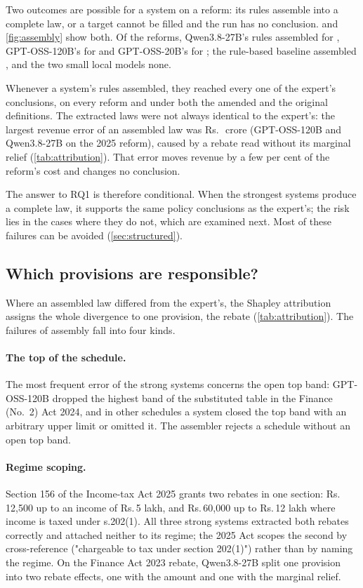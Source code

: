 \documentclass[sn-apa]{sn-jnl}
\providecommand{\rupee}{Rs.\,}
\begin{document}
Two outcomes are possible for a system on a reform: its rules assemble into
a complete law, or a target cannot be filled and the run has no conclusion.
 and \cref{fig:assembly} show both. Of the  reforms, Qwen3.8-27B's
rules assembled for , GPT-OSS-120B's for
 and GPT-OSS-20B's for
; the rule-based baseline assembled
, and the two small local models none.

Whenever a system's rules assembled, they reached every one of the
expert's  conclusions, on every reform and under both the
amended and the original definitions. The extracted laws were not always
identical to the expert's: the largest revenue error of an assembled law
was \rupee{}~crore (GPT-OSS-120B and Qwen3.8-27B on
the 2025 reform), caused by a rebate read without its marginal relief
(\cref{tab:attribution}). That error moves revenue by a few per cent of the
reform's cost and changes no conclusion.

The answer to RQ1 is therefore conditional. When the strongest systems
produce a complete law, it supports the same policy conclusions as the
expert's; the risk lies in the cases where they do not, which are examined
next. Most of these failures can be avoided (\cref{sec:structured}).

\subsection{Which provisions are responsible?}

Where an assembled law differed from the expert's, the Shapley attribution
assigns the whole divergence to one provision, the rebate
(\cref{tab:attribution}). The failures of assembly fall into four kinds.

\paragraph{The top of the schedule.} The most frequent error of the strong
systems concerns the open top band: GPT-OSS-120B dropped the highest band of
the substituted table in the Finance (No.~2) Act 2024, and in other
schedules a system closed the top band with an arbitrary upper limit or
omitted it. The assembler rejects a schedule without an open top band.

\paragraph{Regime scoping.} Section 156 of the Income-tax Act 2025 grants
two rebates in one section: \rupee12,500 up to an income of \rupee5 lakh, and
\rupee60,000 up to \rupee12 lakh where income is taxed under s.202(1). All
three strong systems extracted both rebates correctly and attached neither
to its regime; the 2025 Act scopes the second by cross-reference
("chargeable to tax under section 202(1)") rather than by naming the regime.
On the Finance Act 2023 rebate, Qwen3.8-27B split one provision into two
rebate effects, one with the amount and one with the marginal relief.
\end{document}
